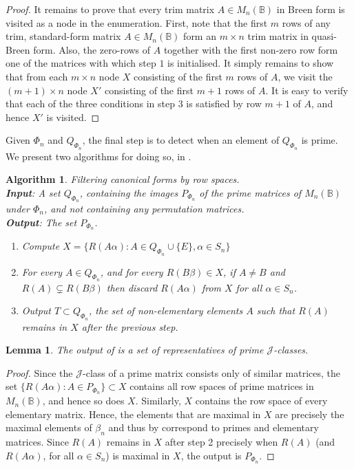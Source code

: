 \documentclass[11pt]{article}
\newtheorem{lemma}[thm]{Lemma}
\newtheorem{algo}[thm]{Algorithm}
\newenvironment{alg}{\begin{algo}\rm}{\end{algo}}
\numberwithin{equation}{section}
\newcommand{\set}[2]{\ensuremath{\{#1 : #2 \}}}
\newcommand{\B}{\mathbb{B}}
\newcommand{\Bn}{M_n(\B)}
\newcommand{\J}{\mathscr{J}}
\begin{document}
\begin{proof}
  It remains to prove that every trim matrix $A \in \Bn$ in Breen form is
  visited as a node in the enumeration. First, note that the first $m$ rows of
  any trim, standard-form matrix $A \in \Bn$ form an $m \times n$ trim matrix in
  quasi-Breen form. Also, the zero-rows of $A$ together with the first
  non-zero row form one of the matrices with which step $1$ is initialised. It
  simply remains to show that from each $m \times n$ node $X$ consisting of the
  first $m$ rows of $A$, we visit the $(m + 1)\times n$ node $X'$ consisting of
  the first $m + 1$ rows of $A$. It is easy to verify that each of the three
  conditions in step $3$ is satisfied by row $m + 1$ of $A$, and hence $X'$ is
  visited.
\end{proof}

Given $\Phi_n$ and $Q_{\Phi_n}$, the final step is to detect when an element of
$Q_{\Phi_n}$ is prime. We present two algorithms for doing so, in
.

\begin{alg}
  Filtering canonical forms by row spaces.\\
  \textbf{Input}: A set $Q_{\Phi_n}$, containing the images $P_{\Phi_n}$ of the
  prime matrices of $\Bn$ under $\Phi_n$, and not containing any permutation
  matrices. \\
  \textbf{Output}: The set $P_{\Phi_n}$.
  \begin{enumerate}
  \item 
    Compute $X = \set{R(A\alpha)}{A \in Q_{\Phi_n} \cup \{E\}, \alpha \in S_n}$
  \item
    For every $A \in Q_{\Phi_n}$, and for every $R(B\beta) \in X$, if $A \neq B$ and
    $R(A) \subsetneq R(B\beta)$ then discard $R(A\alpha)$ from $X$ for all
    $\alpha \in S_n$.
  \item
    Output $T\subset Q_{\Phi_n}$, the set of non-elementary elements $A$ such that $R(A)$
    remains in $X$ after the previous step.
  \end{enumerate}
\end{alg}

\begin{lemma}
  The output of  is a set of representatives of prime
  $\J$-classes.
\end{lemma}
\begin{proof}
  Since the $\J$-class of a prime matrix consists only of similar matrices, the
  set $\set{R(A\alpha)}{A \in P_{\Phi_n}} \subset X$ contains all row spaces of
  prime matrices in $\Bn$, and hence so does $X$. Similarly, $X$ contains the
  row space of every elementary matrix. Hence, the elements that are maximal in
  $X$ are precisely the maximal elements of $\beta_n$ and thus by
   correspond to primes and elementary matrices.
  Since $R(A)$ remains in $X$ after step 2 precisely when $R(A)$ (and
  $R(A\alpha)$, for all $\alpha \in S_n$) is maximal in $X$, the output is
  $P_{\Phi_n}$.
\end{proof} 
\end{document}

